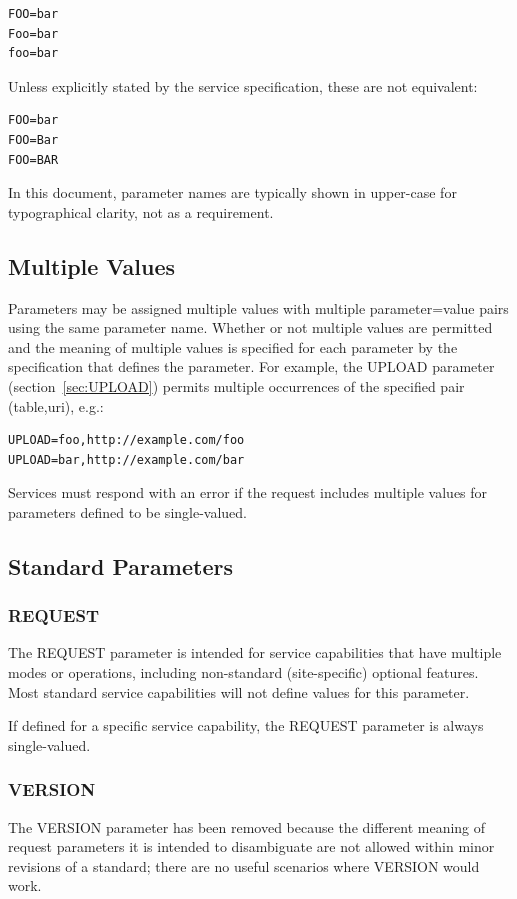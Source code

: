 \documentclass[11pt,letter]{ivoa}
\begin{document}
\begin{verbatim}
FOO=bar
Foo=bar
foo=bar
\end{verbatim}

Unless explicitly stated by the service specification, these are not equivalent:

\begin{verbatim}
FOO=bar
FOO=Bar
FOO=BAR
\end{verbatim}

In this document, parameter names are typically shown in upper-case for
typographical clarity, not as a requirement.

\subsection{Multiple Values}
Parameters may be assigned multiple values with multiple parameter=value pairs
using the same parameter name. Whether or not multiple values are permitted and
the meaning of multiple values is specified for each parameter by the
specification that defines the parameter. For example, the UPLOAD parameter
(section~\ref{sec:UPLOAD}) permits multiple occurrences of the specified
pair (table,uri), e.g.:

\begin{verbatim}
UPLOAD=foo,http://example.com/foo
UPLOAD=bar,http://example.com/bar
\end{verbatim}

Services must respond with an error if the request includes multiple values for
parameters defined to be single-valued.

\subsection{Standard Parameters}

\subsubsection{REQUEST}
\label{sec:REQUEST}
The REQUEST parameter is intended for service capabilities that have
multiple modes or operations, including non-standard (site-specific) optional
features. Most standard service capabilities will not define values for this
parameter.

If defined for a specific service capability, the REQUEST parameter is always
single-valued.

\subsubsection{VERSION}
\label{sec:VERSION}
The VERSION parameter has been removed because the different
meaning of request
parameters it is intended to disambiguate are not allowed within minor
revisions of a standard; there are no useful scenarios where VERSION would work.
\end{document}
